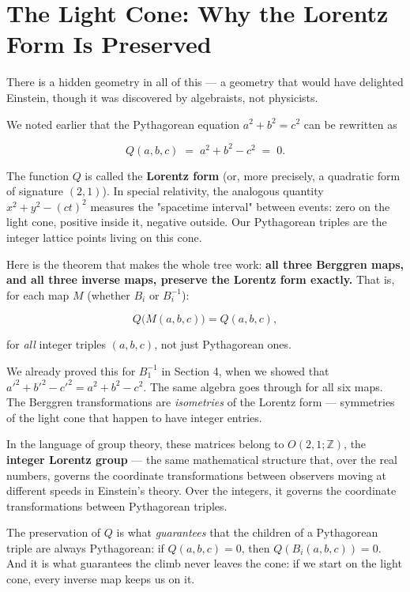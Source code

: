 \ornbreak



\section{The Light Cone: Why the Lorentz Form Is Preserved}


There is a hidden geometry in all of this --- a geometry that would have delighted Einstein, though it was discovered by algebraists, not physicists.

We noted earlier that the Pythagorean equation $a^2 + b^2 = c^2$ can be rewritten as

\[
Q(a, b, c) \;=\; a^2 + b^2 - c^2 \;=\; 0.
\]

The function $Q$ is called the \textbf{Lorentz form} (or, more precisely, a quadratic form of signature $(2,1)$). In special relativity, the analogous quantity $x^2 + y^2 - (ct)^2$ measures the "spacetime interval" between events: zero on the light cone, positive inside it, negative outside. Our Pythagorean triples are the integer lattice points living on this cone.

Here is the theorem that makes the whole tree work: \textbf{all three Berggren maps, and all three inverse maps, preserve the Lorentz form exactly.} That is, for each map $M$ (whether $B_i$ or $B_i^{-1}$):

\[
Q\bigl(M(a, b, c)\bigr) = Q(a, b, c),
\]

for \textit{all} integer triples $(a, b, c)$, not just Pythagorean ones.

We already proved this for $B_1^{-1}$ in Section 4, when we showed that ${a'}^2 + {b'}^2 - {c'}^2 = a^2 + b^2 - c^2$. The same algebra goes through for all six maps. The Berggren transformations are \textit{isometries} of the Lorentz form --- symmetries of the light cone that happen to have integer entries.

In the language of group theory, these matrices belong to $O(2,1;\mathbb{Z})$, the \textbf{integer Lorentz group} --- the same mathematical structure that, over the real numbers, governs the coordinate transformations between observers moving at different speeds in Einstein's theory. Over the integers, it governs the coordinate transformations between Pythagorean triples.

The preservation of $Q$ is what \textit{guarantees} that the children of a Pythagorean triple are always Pythagorean: if $Q(a,b,c) = 0$, then $Q(B_i(a,b,c)) = 0$. And it is what guarantees the climb never leaves the cone: if we start on the light cone, every inverse map keeps us on it.

